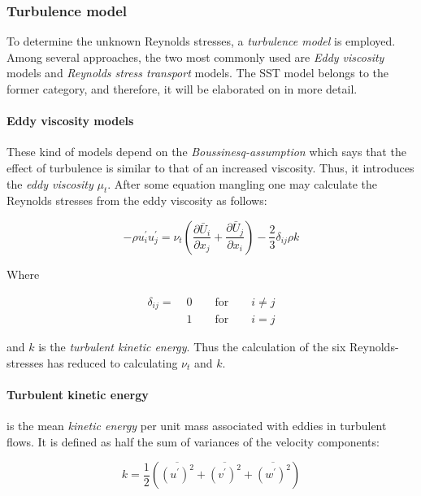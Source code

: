 \subsubsection{Turbulence model}
To determine the unknown Reynolds stresses, a \textit{turbulence model} is
employed. Among several approaches, the two most commonly used are \textit{Eddy
viscosity} models and \textit{Reynolds stress transport} models. The SST model
belongs to the former category, and therefore, it will be elaborated on in more
detail.

\paragraph{Eddy viscosity models}
These kind of models depend on the \textit{Boussinesq-assumption} which says
that the effect of turbulence is similar to that of an increased viscosity.
Thus, it introduces the \textit{eddy viscosity} $\mu_{t}$. After some equation
mangling one may calculate the Reynolds stresses from the eddy viscosity as
follows:

\begin{equation}
    - \rho u_{i}^{\prime} u_{j}^{\prime} =
    \nu_{t} (\frac{\partial \bar U_{i}}{\partial x_{j}} +
    \frac{\partial \bar U_{j}}{\partial x_{i}}) -
    \frac{2}{3} \delta_{ij} \rho k
    \label{eq:boussinesq}
\end{equation}

\noindent Where

\begin{align*}
    \delta_{ij} = \; &0 \qquad \text{for} \qquad i \neq j \\
    &1 \qquad \text{for} \qquad i = j
\end{align*}

\noindent and $k$ is the \textit{turbulent kinetic energy}. Thus the calculation
of the six Reynolds-stresses has reduced to calculating $\nu_{t}$ and $k$.
\cite{leschziner2015statistical}

\paragraph{Turbulent kinetic energy}
is the mean \textit{kinetic energy} per unit mass associated with eddies in
turbulent flows. It is defined as half the sum of variances of the velocity
components:

\begin{equation}
    k = \frac{1}{2} \left( 
    \overline{(u^{\prime})^2} +
    \overline{(v^{\prime})^2} +
    \overline{(w^{\prime})^2}
    \right)
\end{equation}








